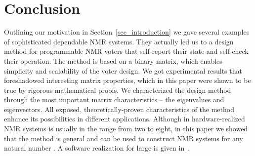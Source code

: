 \documentclass[technote, a4paper, onecolumn]{IEEEtran}  \newcommand{\avtor}{Aleksandar Simevski}
\begin{document}
\section{Conclusion} \label{sec_conclusion}

Outlining our motivation in Section~\ref{sec_introduction} we gave several examples of sophisticated dependable NMR systems. They actually led us to a design method for programmable NMR voters that self-report their state and self-check their operation. The method is based on a binary matrix, which enables simplicity and scalability of the voter design. We got experimental results that foreshadowed interesting matrix properties, which in this paper were shown to be true by rigorous mathematical proofs.  We characterized the design method through the most important matrix characteristics -- the eigenvalues and eigenvectors. All exposed, theoretically-proven characteristics of the method enhance its possibilities in different applications. Although in hardware-realized NMR systems  is usually in the range from two to eight, in this paper we showed that the method is general and can be used to construct NMR systems for any natural number . A software realization for large  is given in~\cite{Simevski2013b}.
\end{document}
